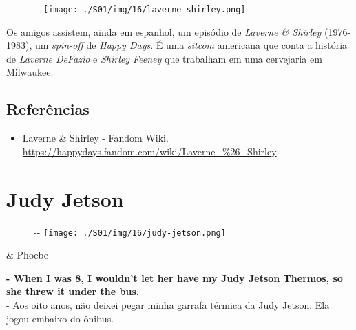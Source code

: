 \begin{figure}[!ht]
  \begin{adjustwidth}{-\oddsidemargin-1in}{-\rightmargin}
    \centering
    \texttt{[image: ./S01/img/16/laverne-shirley.png]}
  \end{adjustwidth}
\end{figure}

Os amigos assistem, ainda em espanhol, um episódio de \emph{Laverne \&
Shirley} (1976-1983), um \emph{spin-off} de \emph{Happy Days}. É uma
\emph{sitcom} americana que conta a história de \emph{Laverne DeFazio} e
\emph{Shirley Feeney} que trabalham em uma cervejaria em Milwaukee.

\hypertarget{referuxeancias-5}{%
\subsection{Referências}\label{referuxeancias-5}}

\begin{itemize}
\tightlist
\item
  \sloppy Laverne & Shirley - Fandom Wiki. \url{https://happydays.fandom.com/wiki/Laverne_%26_Shirley}
\end{itemize}

\hypertarget{judy-jetson}{%
\section{Judy Jetson}\label{judy-jetson}}

\begin{figure}[!ht]
  \begin{adjustwidth}{-\oddsidemargin-1in}{-\rightmargin}
    \centering
    \texttt{[image: ./S01/img/16/judy-jetson.png]}
  \end{adjustwidth}
\end{figure}

\begin{tcolorbox}[enhanced,center upper,
    drop fuzzy shadow southeast, boxrule=0.3pt,
    lower separated=false,
    colframe=black!30!dialogoBorder,colback=white]
\begin{minipage}[c]{0.16\linewidth}
   & \centering \scriptsize{Phoebe}
\end{minipage}
\hfill
\begin{minipage}[c]{0.8\linewidth}
  \textbf{- When I was 8, I wouldn't let her have my Judy Jetson Thermos, so she threw it under the bus.}\\
  - Aos oito anos, não deixei pegar minha garrafa térmica da Judy Jetson. Ela jogou embaixo do ônibus.
\end{minipage}
\end{tcolorbox}

